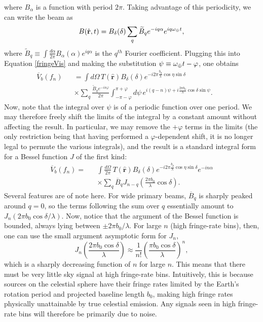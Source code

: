 \documentclass[twocolumn,apj,numberedappendix]{emulateapj}
\newcommand{\rhat}{\hat{\mathbf{r}}}
\begin{document}
where $B_\alpha$ is a function with period $2\pi$.  Taking advantage of this periodicity, we can write the beam as
\begin{equation}
B(\rhat, t) = B_\delta (\delta) \sum_q \widetilde{B}_q e^{-iq \alpha} e^{i q \omega_\Earth t},
\end{equation}
where $\widetilde{B}_q \equiv \int \frac{d\alpha}{2\pi} B_\alpha(\alpha)
e^{i q\alpha}$ is the $q^{th}$ Fourier coefficient.  Plugging this into
Equation \eqref{fringeVis} and making the substitution $\psi \equiv
\omega_\oplus t - \varphi$, one obtains
\begin{eqnarray}
\overline{V}_b (f_n) &&= \int d\Omega \, T(\rhat) B_\delta (\delta) e^{-i 2 \pi  \frac{b_y}{\lambda} \cos \eta \sin \delta} \nonumber \\
&& \times \sum_q \frac{\widetilde{B}_q e^{-i n \varphi}}{2 \pi} \int_{-\pi -\varphi}^{\pi+\varphi} d\psi \, e^{i (q-n) \psi +i \frac{2 \pi b_0}{\lambda} \cos \delta \sin \psi}. \qquad
\end{eqnarray}
Now, note that the integral over $\psi$ is of a periodic function over one
period.  We may therefore freely shift the limits of the integral by a constant
amount without affecting the result.  In particular, we may remove the
$+\varphi$ terms in the limits (the only restriction being that having performed a $\varphi$-dependent shift, it is no longer legal to permute the various integrals), and
the result is a standard integral form for a Bessel function $J$ of the first
kind:
\begin{eqnarray}
\label{fringeBessel}
\overline{V}_b (f_n) =&& \int \frac{d\Omega}{2 \pi}\, T(\rhat) B_\delta (\delta) e^{-i 2 \pi  \frac{b_y}{\lambda} \cos \eta \sin \delta}
e^{-i n \alpha} \nonumber \\ 
&& \times \sum_q \overline{B}_q  J_{n-q} \left( \frac{2 \pi b_0}{\lambda} \cos \delta \right).
\end{eqnarray}
Several features are of note here.  For wide primary beams, $\overline{B}_q$
is sharply peaked around $q=0$, so the terms following the sum over $q$
essentially amount to $J_n ( 2 \pi b_0 \cos \delta / \lambda )$.  Now, notice
that the argument of the Bessel function is bounded, always lying between $\pm
2\pi b_0/ \lambda$.  For large $n$ (high fringe-rate bins), then, one can use
the small argument asymptotic form for $J_n$,\begin{equation}
J_n \left( \frac{2 \pi b_0 \cos \delta}{ \lambda} \right) \approx \frac{1}{n!} \left( \frac{ \pi b_0 \cos \delta}{ \lambda} \right)^n,
\end{equation}
which is a sharply decreasing function of $n$ for large $n$.  This means that
there must be very little sky signal at high fringe-rate bins.  Intuitively,
this is because sources on the celestial sphere have their fringe rates limited
by the Earth's rotation period and projected baseline length $b_0$, making high
fringe rates physically unattainable by true celestial emission.  Any signals
seen in high fringe-rate bins will therefore be primarily due to noise.
\end{document}

